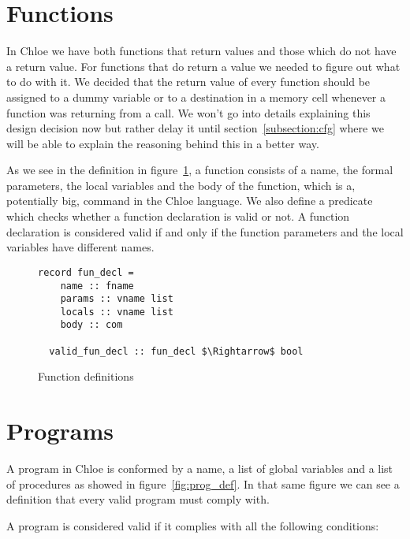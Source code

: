 \section{Functions}\label{section:functions_commands}

In Chloe we have both functions that return values and those which do not have a return value.
For functions that do return a value we needed to figure out what to do with it.
We decided that the return value of every function should be assigned to a dummy variable or to a destination in a memory cell whenever a function was returning from a call.
We won't go into details explaining this design decision now but rather delay it until section~\ref{subsection:cfg} where we will be able to explain the reasoning behind this in a better way.

As we see in the definition in figure~\ref{fig:fun_def}, a function consists of a name, the formal parameters, the local variables and the body of the function, which is a, potentially big, command in the Chloe language.
We also define a predicate which checks whether a function declaration is valid or not.
A function declaration is considered valid if and only if the function parameters and the local variables have different names.

\begin{figure}
  \begin{lstlisting}[frame=single, mathescape=true]
  record fun_decl =
    name :: fname
    params :: vname list
    locals :: vname list
    body :: com

  valid_fun_decl :: fun_decl $\Rightarrow$ bool
  \end{lstlisting}

  \caption{Function definitions}
  \label{fig:fun_def}
\end{figure}

\section{Programs}\label{section:programs_commands}

A program in Chloe is conformed by a name, a list of global variables and a list of procedures as showed in figure~\ref{fig:prog_def}.
In that same figure we can see a definition that every valid program must comply with.

A program is considered valid if it complies with all the following conditions:

